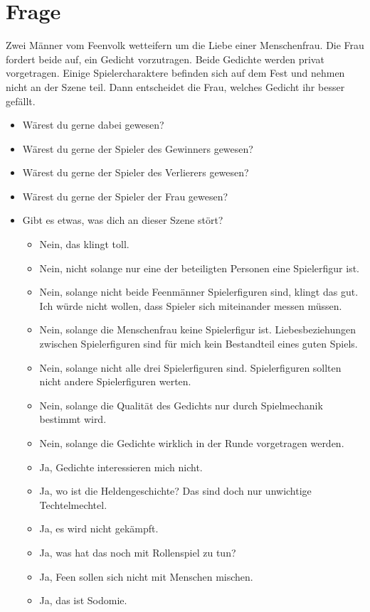 \documentclass{article}
\newcommand\frage[1]{\section{Frage}\label{#1}}
\begin{document}
\frage{wettstreit}

Zwei Männer vom Feenvolk wetteifern um die Liebe einer
Menschenfrau. Die Frau fordert beide auf, ein Gedicht
vorzutragen. Beide Gedichte werden privat vorgetragen. Einige
Spielercharaktere befinden sich auf dem Fest und nehmen nicht an der
Szene teil. Dann entscheidet die Frau, welches Gedicht ihr besser
gefällt.

\begin{itemize}
\item  Wärest du gerne dabei gewesen?
\item  Wärest du gerne der Spieler des Gewinners gewesen?
\item  Wärest du gerne der Spieler des Verlierers gewesen?
\item  Wärest du gerne der Spieler der Frau gewesen?
\item  Gibt es etwas, was dich an dieser Szene stört?
  \begin{itemize}
  \item Nein, das klingt toll.
  \item Nein, nicht solange nur eine der beteiligten Personen eine Spielerfigur ist. 
  \item Nein, solange nicht beide Feenmänner Spielerfiguren sind,
    klingt das gut. Ich würde nicht wollen, dass Spieler sich miteinander messen müssen.
  \item Nein, solange die Menschenfrau keine Spielerfigur
    ist. Liebesbeziehungen zwischen Spielerfiguren sind für mich kein
    Bestandteil eines guten Spiels.
  \item Nein, solange nicht alle drei Spielerfiguren
    sind. Spielerfiguren sollten nicht andere Spielerfiguren werten.
  \item Nein, solange die Qualität des Gedichts nur durch Spielmechanik bestimmt wird.
  \item Nein, solange die Gedichte wirklich in der Runde vorgetragen werden.
  \item Ja, Gedichte interessieren mich nicht.
  \item Ja, wo ist die Heldengeschichte? Das sind doch nur unwichtige Techtelmechtel.
  \item Ja, es wird nicht gekämpft.
  \item Ja, was hat das noch mit Rollenspiel zu tun?
  \item Ja, Feen sollen sich nicht mit Menschen mischen.
  \item Ja, das ist Sodomie.
  \end{itemize}
\end{itemize}
\end{document}
